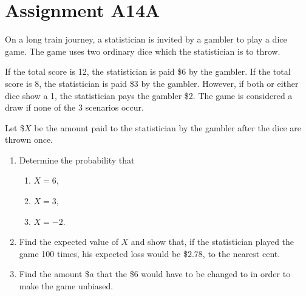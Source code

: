 \section{Assignment A14A}

\begin{problem}
    On a long train journey, a statistician is invited by a gambler to play a dice game. The game uses two ordinary dice which the statistician is to throw.

    If the total score is 12, the statistician is paid \$6 by the gambler. If the total score is 8, the statistician is paid \$3 by the gambler. However, if both or either dice show a 1, the statistician pays the gambler \$2. The game is considered a draw if none of the 3 scenarios occur.

    Let \$$X$ be the amount paid to the statistician by the gambler after the dice are thrown once.

    \begin{enumerate}
        \item Determine the probability that
        \begin{enumerate}
            \item $X = 6$,
            \item $X = 3$,
            \item $X = -2$.
        \end{enumerate}
        \item Find the expected value of $X$ and show that, if the statistician played the game 100 times, his expected loss would be \$$2.78$, to the nearest cent.
        \item Find the amount \$$a$ that the \$6 would have to be changed to in order to make the game unbiased.
    \end{enumerate}
\end{problem}
